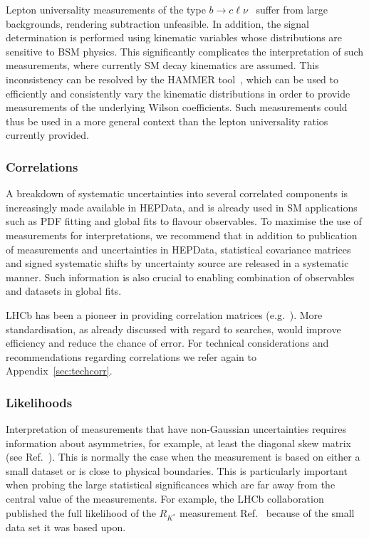 \documentclass[a4paper,aps,prd,longbibliography,notitlepage,showpacs,amsmath,amssymb,superscriptaddress,nofootinbib,floatfix,11pt,preprintnumbers]{revtex4-1-mod}
\newcommand{\hepdata}{\textsf{HEPData}\xspace}
\newcommand{\eg}{e.g.\xspace}
\begin{document}
Lepton universality measurements of the type $b\to c\ell\nu$~\cite{Aaij:2017deq,Aaij:2017uff,Aaij:2015yra} suffer from large backgrounds, rendering subtraction unfeasible. In addition, the signal determination is performed using kinematic variables whose distributions  are sensitive to BSM physics. This significantly complicates the interpretation of such measurements, where currently  SM decay kinematics are assumed. This inconsistency can be resolved by the \textsf{HAMMER} tool~\cite{Bernlochner:2020tfi}, which can be used to efficiently and consistently vary the kinematic distributions in order to provide measurements of the underlying Wilson coefficients. Such measurements could thus be used in a more general context than the lepton universality ratios currently provided.\\

\subsubsection{Correlations}
A breakdown of systematic uncertainties into several correlated components is increasingly made available in \hepdata, and is already used in SM applications such as PDF fitting and global fits to flavour observables.
To maximise the use of measurements for interpretations, we recommend that in addition to publication of measurements and uncertainties in \hepdata, statistical covariance matrices and signed systematic shifts by uncertainty source are released in a systematic manner.
Such information is also crucial to enabling combination of observables and datasets in global fits.

LHCb has been a pioneer in providing correlation matrices (\eg~\cite{Aaij:2015oid}). More standardisation, as already discussed with regard to searches, would improve efficiency and reduce the chance of error. For technical considerations and recommendations regarding correlations we refer again to Appendix~\ref{sec:techcorr}. \\

\subsubsection{Likelihoods}
Interpretation of measurements that have non-Gaussian uncertainties requires  information about asymmetries, for example, at least the diagonal skew matrix (see Ref.~\cite{Buckley:2018vdr}).
This is normally the case when the measurement is based on either a small dataset or is close to physical boundaries. This is particularly important when probing the large statistical significances which are far away from the central value of the measurements. For example, the LHCb collaboration published the full likelihood of the $R_{K^{*}}$ measurement Ref.~\cite{Aaij:2017vbb} because of the small data set it was based upon.
\end{document}
